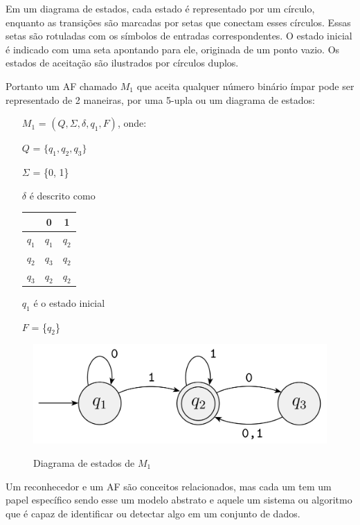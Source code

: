 Em um diagrama de estados, cada estado é representado por um círculo, enquanto as transições são marcadas por setas que conectam esses círculos. Essas setas são rotuladas com os símbolos de entradas correspondentes. O estado inicial é indicado com uma seta apontando para ele, originada de um ponto vazio. Os estados de aceitação são ilustrados por círculos duplos.

Portanto um \ac{AF} chamado $M_1$ que aceita qualquer número binário ímpar pode ser representado de 2 maneiras,  por uma 5-upla ou um diagrama de estados:

\begin{itemize}
    \item[$M_1$] = $(Q, \Sigma, \delta, q_1, F)$, onde:
    \item[$Q$] = $\{q_1, q_2, q_3\}$
    \item[$\Sigma$] = \{0, 1\}
    \item [$\delta$] é descrito como
    \item [ ]
        \begin{tabular}{c|cc}
            & 0 & 1 \\ \hline
            $q_1$ & $q_1$ & $q_2$ \\
            $q_2$ & $q_3$ & $q_2$ \\
            $q_3$ & $q_2$ & $q_2$ \\
        \end{tabular}
    \item[$q_1$] é o estado inicial
    \item[$F$] = \{$q_2$\}
\end{itemize}

\begin{figure}[H]
	\centering
    \caption{Diagrama de estados de $M_1$}
	\includegraphics[scale=1]{figuras/AFD/m1.png}
	\label{fig:Diagrama de estados}
\end{figure}

Um reconhecedor e um \ac{AF} são conceitos relacionados, mas cada um tem um papel específico sendo esse um modelo abstrato e aquele um sistema ou algoritmo que é capaz de identificar ou detectar algo em um conjunto de dados.
